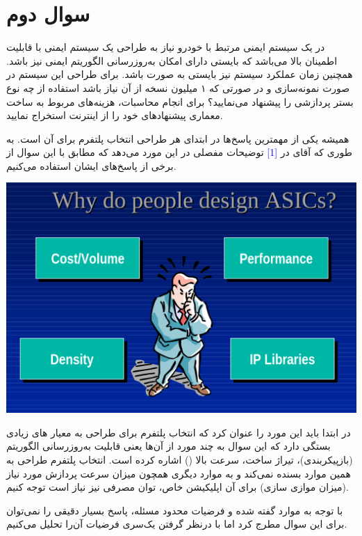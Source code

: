 \section{سوال دوم}
در یک سیستم ایمنی مرتبط با خودرو نیاز به طراحی یک سیستم ایمنی با قابلیت اطمینان بالا می‌باشد که بایستی دارای امکان به‌روزرسانی الگوریتم ایمنی نیز باشد. همچنین زمان عملکرد سیستم نیز بایستی به صورت  باشد. برای طراحی این سیستم در صورت نمونه‌سازی و در صورتی که ۱ میلیون نسخه از آن نیاز باشد استفاده از چه نوع بستر پردازشی را پیشنهاد می‌نمایید؟ برای انجام محاسبات، هزینه‌های مربوط به ساخت معماری پیشنهادهای خود را از اینترنت استخراج نمایید.



\begin{qsolve}
	
	همیشه یکی از مهمترین پاسخ‌ها در ابتدای هر طراحی انتخاب پلتفرم برای آن است. به طوری که آقای  در \textcolor{blue}{[1]} توضیحات مفصلی در این مورد می‌دهد که مطابق با این سوال از برخی از پاسخ‌های ایشان استفاده می‌کنیم.
	
	
\begin{center}
	\includegraphics*[width=0.8\linewidth]{pics/img4.png}
	\label{اف‌پی‌جی‌ای یا ایسیک؟}
\end{center}

در ابتدا باید این مورد را عنوان کرد که انتخاب پلتفرم برای طراحی به معیار های زیادی بستگی دارد که این سوال به چند مورد از آن‌ها یعنی قابلیت به‌روزرسانی الگوریتم (بازپیکربندی)، تیراژ ساخت، سرعت بالا () اشاره کرده است. انتخاب پلتفرم طراحی به همین موارد بسنده نمی‌کند و به موارد دیگری همچون میزان سرعت پردازش مورد نیاز (میزان موازی سازی) برای آن اپلیکیشن خاص، توان مصرفی نیز نیاز است توجه کنیم.

با توجه به موارد گفته شده و فرضیات محدود مسئله، پاسخ بسیار دقیقی را نمی‌توان برای این سوال مطرج کرد اما با درنظر گرفتن یک‌سری فرضیات آن‌را تحلیل می‌کنیم.


\end{qsolve}
